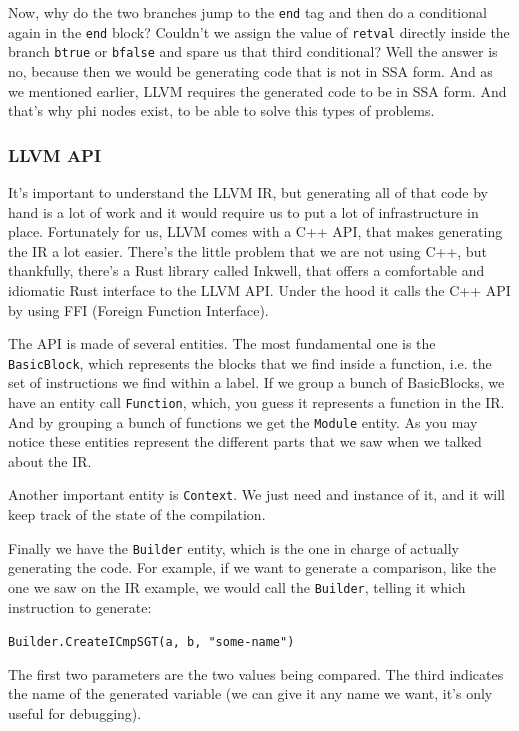 ﻿\documentclass[10pt,a4paper,twocolumn,twoside]{article}
\begin{document}
Now, why do the two branches jump to the \texttt{end} tag and then do a
conditional again in the \texttt{end} block? Couldn't we assign the value of
\texttt{retval} directly inside the branch \texttt{btrue} or \texttt{bfalse} and
spare us that third conditional? Well the answer is no, because then we would be
generating code that is not in SSA form. And as we mentioned earlier, LLVM
requires the generated code to be in SSA form. And that's why phi nodes exist,
to be able to solve this types of problems.

\subsubsection{LLVM API}

It's important to understand the LLVM IR, but generating all of that code by 
hand is a lot of work and it would require us to put a lot of infrastructure in
place. Fortunately for us, LLVM comes with a C++ API, that makes generating the
IR a lot easier. There's the little problem that we are not using C++, but 
thankfully, there's a Rust library called Inkwell, that offers a comfortable and 
idiomatic Rust interface to the LLVM API. Under the hood it calls the C++ API
by using FFI (Foreign Function Interface).

The API is made of several entities. The most fundamental one is the
\texttt{BasicBlock}, which represents the blocks that we find inside a function,
i.e. the set of instructions we find within a label. If we group a bunch of
BasicBlocks, we have an entity call \texttt{Function}, which, you guess it 
represents a function in the IR. And by grouping a bunch of functions we get the
\texttt{Module} entity. As you may notice these entities represent the different
parts that we saw when we talked about the IR.

Another important entity is \texttt{Context}. We just need and instance of it, 
and it will keep track of the state of the compilation.

Finally we have the \texttt{Builder} entity, which is the one in charge of 
actually generating the code. For example, if we want to generate a comparison,
like the one we saw on the IR example, we would call the \texttt{Builder}, 
telling it which instruction to generate:

\texttt{Builder.CreateICmpSGT(a, b, "some-name")}

The first two parameters are the two values being compared. The third 
indicates the name of the generated variable (we can give it any name we want,
it's only useful for debugging).
\end{document}
